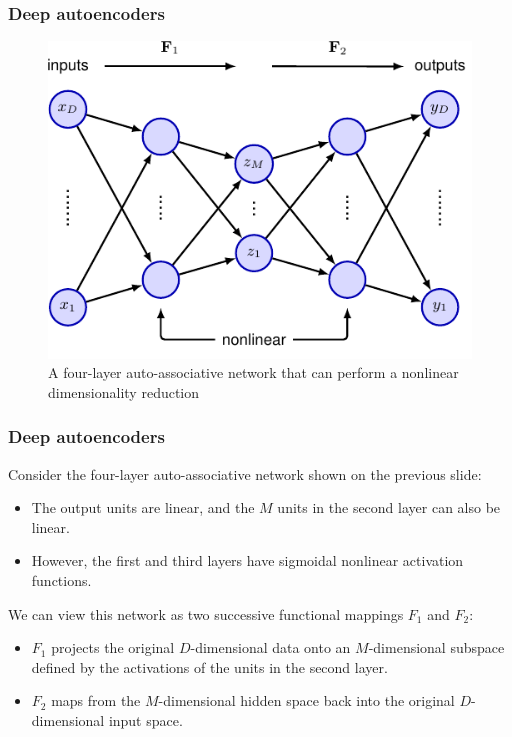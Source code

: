 \documentclass{beamer}
\begin{document}
\begin{frame}
    \frametitle{Deep autoencoders}
    \begin{figure}
        \caption{A four-layer auto-associative network that can perform a nonlinear dimensionality reduction}
        \includegraphics[height=0.6\textheight]{Figure_2.pdf}
    \end{figure}
\end{frame}

\begin{frame}
    \frametitle{Deep autoencoders}
    Consider the four-layer auto-associative network shown on the previous slide:
    \begin{itemize}
        \item The output units are linear, and the $M$ units in the second layer can also be linear.
        \item However, the first and third layers have sigmoidal nonlinear activation functions.
    \end{itemize}
    We can view this network as two successive functional mappings $F_{1}$ and $F_{2}$:
    \begin{itemize}
        \item $F_{1}$ projects the original $D$-dimensional data onto an $M$-dimensional subspace defined by the activations of the units in the second layer.
        \item $F_{2}$ maps from the $M$-dimensional hidden space back into the original $D$-dimensional input space.
    \end{itemize}
\end{frame}
\end{document}
